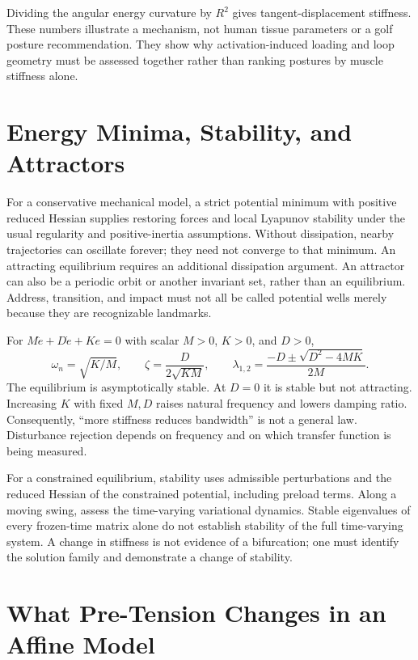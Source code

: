 Dividing the angular energy curvature by $R^2$ gives tangent-displacement stiffness. These
numbers illustrate a mechanism, not human tissue parameters or a golf posture
recommendation. They show why activation-induced loading and loop geometry
must be assessed together rather than ranking postures by muscle stiffness
alone.

\section{Energy Minima, Stability, and Attractors}
\label{sec:attractors}

For a conservative mechanical model, a strict potential minimum with positive
reduced Hessian supplies restoring forces and local Lyapunov stability under
the usual regularity and positive-inertia assumptions. Without dissipation,
nearby trajectories can oscillate forever; they need not converge to that
minimum. An attracting equilibrium requires an additional dissipation argument.
An attractor can also be a periodic orbit or another invariant set, rather than
an equilibrium. Address, transition, and impact must not all be called potential
wells merely because they are recognizable landmarks.

For $M\ddot e+D\dot e+Ke=0$ with scalar $M>0$, $K>0$, and $D>0$,
\begin{equation}
\omega_n=\sqrt{K/M},\qquad \zeta=\frac{D}{2\sqrt{KM}},\qquad
\lambda_{1,2}=\frac{-D\pm\sqrt{D^2-4MK}}{2M}.
\end{equation}
The equilibrium is asymptotically stable. At $D=0$ it is stable but not
attracting. Increasing $K$ with fixed $M,D$ raises natural frequency and lowers
damping ratio. Consequently, ``more stiffness reduces bandwidth'' is not a
general law. Disturbance rejection depends on frequency and on which transfer
function is being measured.

For a constrained equilibrium, stability uses admissible perturbations and the
reduced Hessian of the constrained potential, including preload terms. Along
a moving swing, assess the time-varying variational dynamics. Stable eigenvalues
of every frozen-time matrix alone do not establish stability of the full
time-varying system. A change in stiffness is not evidence of a bifurcation;
one must identify the solution family and demonstrate a change of stability.

\section{What Pre-Tension Changes in an Affine Model}
\label{sec:drift_control_perspective}

